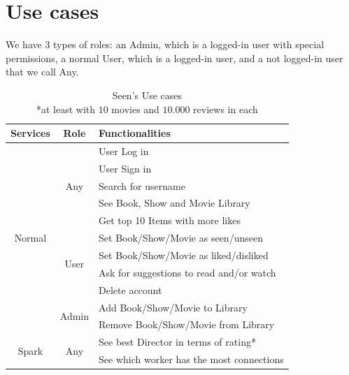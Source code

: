 \documentclass[oneside]{article}
\newcommand*\fpar{\hspace{1ex}}
\begin{document}
\section{Use cases}
\label{sec:cases}
\fpar We have 3 types of roles: an Admin, which is a logged-in user with special permissions, a normal User, which is a logged-in user, and a not logged-in user that we call Any.
\begin{table}[H]
  \centering
  \begin{tabular}{c|c|l} 
    Services & Role & Functionalities                 \\ \hline
    \multirow{11}{*}{ Normal }
      & \multirow{5}{*}{ Any } 
        & User Log in                                \\
      & & User Sign in                                 \\
      & & Search for username                         \\
      & & See Book, Show and Movie Library            \\ 
      & & Get top 10 Items with more likes            \\ \cline{2-3}
      & \multirow{4}{*}{ User } 
        & Set Book/Show/Movie as seen/unseen          \\
      & & Set Book/Show/Movie as liked/disliked       \\ 
      & & Ask for suggestions to read and/or watch    \\ 
      & & Delete account                              \\ \cline{2-3}
    & \multirow{2}{*}{ Admin } 
        & Add Book/Show/Movie to Library              \\
      & & Remove Book/Show/Movie from Library         \\ \hline
    \multirow{2}{*}{ Spark }
      & \multirow{2}{*}{ Any }
        & See best Director in terms of rating*       \\
      & & See which worker has the most connections   \\
  \end{tabular}
  \caption{Seen's Use cases                           \\
          \**at least with $10$ movies and $10.000$ reviews in each}
\end{table}
\end{document}
